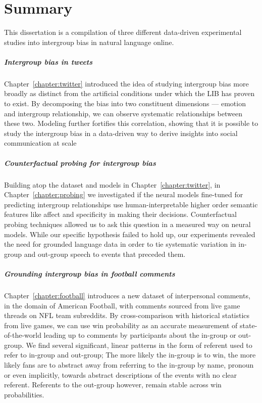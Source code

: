 \chapter{Summary}
\label{chapter:summary}

This dissertation is a compilation of three different data-driven experimental studies into intergroup bias in natural language online.

\paragraph{Intergroup bias in tweets} Chapter~\ref{chapter:twitter} introduced the idea of studying intergroup bias more broadly as distinct from the artificial conditions under which the LIB has proven to exist. By decomposing the bias into two constituent dimensions --- emotion and intergroup relationship, we can observe systematic relationships between these two. Modeling further fortifies this correlation, showing that it is possible to study the intergroup bias in a data-driven way to derive insights into social communication at scale

\paragraph{Counterfactual probing for intergroup bias} Building atop the dataset and models in Chapter~\ref{chapter:twitter}, in Chapter~\ref{chapter:probing} we investigated if the neural models fine-tuned for predicting intergroup relationships use human-interpretable higher order semantic features like affect and specificity in making their decisions. Counterfactual probing techniques allowed us to ask this question in a measured way on neural models. While our specific hypothesis failed to hold up, our experiments revealed the need for grounded language data in order to tie systematic variation in in-group and out-group speech to events that preceded them.

\paragraph{Grounding intergroup bias in football comments} Chapter~\ref{chapter:football} introduces a new dataset of interpersonal comments, in the domain of American Football, with comments sourced from live game threads on NFL team subreddits. By cross-comparison with historical statistics from live games, we can use win probability as an accurate measurement of state-of-the-world leading up to comments by participants about the in-group or out-group. We find several significant, linear patterns in the form of referent used to refer to in-group and out-group; The more likely the in-group is to win, the more likely fans are to abstract away from referring to the in-group by name, pronoun or even implicitly, towards abstract descriptions of the events with no clear referent. Referents to the out-group however, remain stable across win probabilities. 

